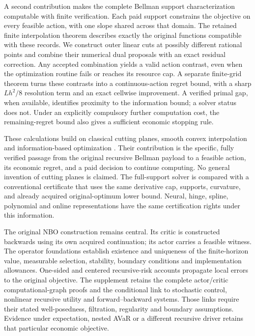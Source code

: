 A second contribution makes the complete Bellman support characterization
computable with finite verification. Each paid support constrains the objective
on every feasible action, with one slope shared across that domain. The retained
finite interpolation theorem describes exactly the original functions compatible
with these records. We construct outer linear cuts at possibly different
rational points and combine their numerical dual proposals with an exact
residual correction. Any accepted combination yields a valid action contrast,
even when the optimization routine fails or reaches its resource cap. A separate
finite-grid theorem turns these contrasts into a continuous-action regret bound,
with a sharp $Lh^2/8$ resolution term and an exact cellwise improvement. A verified
primal gap, when available, identifies proximity to the information bound; a
solver status does not. Under an explicitly compulsory further computation cost,
the remaining-regret bound also gives a sufficient economic stopping rule.

These calculations build on classical cutting planes, smooth convex interpolation
and information-based optimization \citep{Kelley1960Cuts126,THG2017Interpolation122,FloreaNesterov2024Oracle125}.
Their contribution is the specific, fully verified passage from the original
recursive Bellman payload to a feasible action, its economic regret, and a paid
decision to continue computing. No general invention of cutting planes is
claimed. The full-support solver is compared with a conventional certificate
that uses the same derivative cap, supports, curvature, and already acquired
original-optimum lower bound. Neural, hinge, spline, polynomial and online
representations have the same certification rights under this information.

The original NBO construction remains central. Its critic is constructed
backwards using its own acquired continuation; its actor carries a feasible
witness. The operator foundations establish existence and uniqueness of the
finite-horizon value, measurable selection, stability, boundary conditions and
implementation allowances. One-sided and centered recursive-risk accounts
propagate local errors to the original objective. The supplement retains the
complete actor/critic computational-graph proofs and the conditional link to
stochastic control, nonlinear recursive utility and forward--backward systems.
Those links require their stated well-posedness, filtration, regularity and
boundary assumptions. Evidence under expectation, nested AVaR or a different
recursive driver retains that particular economic objective.

